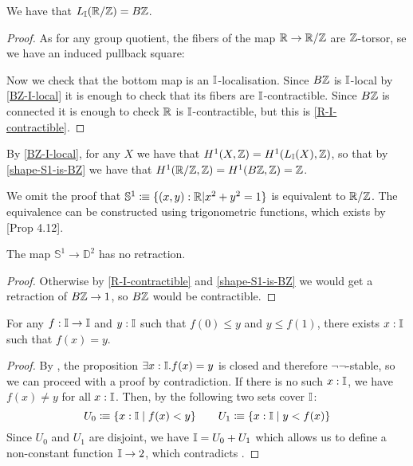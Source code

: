 \begin{proposition}\label{shape-S1-is-BZ}
We have that $L_{\mathbb{I}}(\mathbb{R}/\mathbb{Z}) = B\mathbb{Z}$.
\end{proposition}

\begin{proof}
As for any group quotient, the fibers of the map $\mathbb{R}\to\mathbb{R}/\mathbb{Z}$ are $\mathbb{Z}$-torsor, se we have an induced pullback square:
\begin{center}
\end{center}
Now we check that the bottom map is an $\mathbb{I}$-localisation. Since $B\mathbb{Z}$ is $\mathbb{I}$-local by \cref{BZ-I-local} it is enough to check that its fibers are $\mathbb{I}$-contractible. Since $B\mathbb{Z}$ is connected it is enough to check $\mathbb{R}$ is $\mathbb{I}$-contractible, but this is \cref{R-I-contractible}.
\end{proof}

\begin{remark}
By \cref{BZ-I-local}, for any $X$ we have that $H^1(X,\mathbb{Z}) = H^1(L_{\mathbb{I}}(X),\mathbb{Z})$, so that by \cref{shape-S1-is-BZ} we have that $H^1(\mathbb{R}/\mathbb{Z},\mathbb{Z}) = H^1(B\mathbb{Z},\mathbb{Z}) = \mathbb{Z}$.
\end{remark}

We omit the proof that $\mathbb{S}^1\vcentcolon\mspace{-1.2mu}\equiv\{(x,y):\mathbb{R}\vert x^2+y^2=1\}$ is equivalent to $\mathbb{R}/\mathbb{Z}$.
The equivalence can be constructed using trigonometric functions, which exists by \cite{Bishop}[Prop 4.12].

\begin{proposition}
\label{no-retraction}
The map $\mathbb{S}^1\to \mathbb{D}^2$ has no retraction.
\end{proposition}

\begin{proof}
Otherwise by \cref{R-I-contractible} and \cref{shape-S1-is-BZ} we would get a retraction of $B\mathbb{Z}\to 1$, so $B\mathbb{Z}$ would be contractible.
\end{proof}

\begin{theorem}
  \label{ivt}
  For any $f: \mathbb{I}\to \mathbb{I}$ and $y:\mathbb{I}$ such that $f(0)\leq y$ and $y\leq f(1)$,
  there exists $x:\mathbb{I}$ such that $f(x)=y$.
\end{theorem}

\begin{proof}
  By , the proposition $\exists x:\mathbb{I}.f(x)=y$ is closed and therefore $\neg\neg$-stable, so we can proceed with a proof by contradiction.
  If there is no such $x:\mathbb{I}$, we have $f(x)\neq y$ for all $x:\mathbb{I}$.
  Then, by  the following two sets cover $\mathbb{I}$:
  \[
    U_0\vcentcolon\mspace{-1.2mu}\equiv \{x:\mathbb{I}\mid f(x)<y\} \quad\quad
    U_1\vcentcolon\mspace{-1.2mu}\equiv \{x:\mathbb{I}\mid y<f(x)\}
    \]
  Since $U_0$ and $U_1$ are disjoint, we have $\mathbb{I}=U_0+U_1$ which allows us to define a non-constant function $\mathbb{I}\to 2$, which contradicts .
\end{proof}

